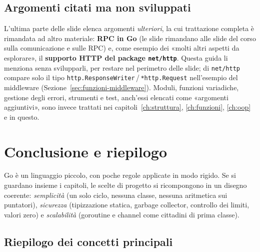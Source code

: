 \documentclass[11pt,a4paper]{report}
\newcommand{\cod}[1]{\texttt{#1}}
\begin{document}
\section{Argomenti citati ma non sviluppati}

L'ultima parte delle slide elenca argomenti \emph{ulteriori}, la cui trattazione
completa è rimandata ad altro materiale: \textbf{RPC in Go} (le slide rimandano
alle slide del corso sulla comunicazione e sulle RPC) e, come esempio dei
«molti altri aspetti da esplorare», il \textbf{supporto HTTP del package
\cod{net/http}}. Questa guida li menziona senza svilupparli, per restare nel
perimetro delle slide; di \cod{net/http} compare solo il tipo
\cod{http.ResponseWriter}\,/\,\cod{*http.Request} nell'esempio del middleware
(Sezione~\ref{sec:funzioni-middleware}). Moduli, funzioni variadiche, gestione
degli errori, strumenti e test, anch'essi elencati come «argomenti
aggiuntivi», sono invece trattati nei capitoli~\ref{ch:struttura},
\ref{ch:funzioni}, \ref{ch:oop} e in questo.

\chapter*{Conclusione e riepilogo}

Go è un linguaggio piccolo, con poche regole applicate in modo rigido. Se si
guardano insieme i capitoli, le scelte di progetto si ricompongono in un disegno
coerente: \emph{semplicità} (un solo ciclo, nessuna classe, nessuna aritmetica sui
puntatori), \emph{sicurezza} (tipizzazione statica, garbage collector,
controllo dei limiti, valori zero) e \emph{scalabilità} (goroutine e channel
come cittadini di prima classe).

\section*{Riepilogo dei concetti principali}
\end{document}
